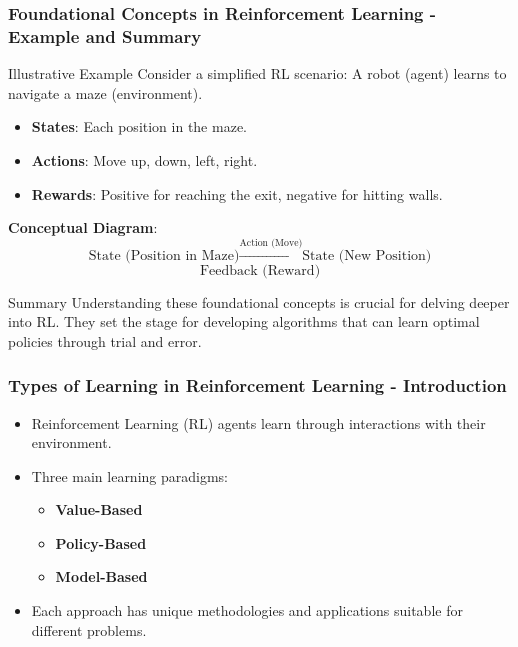 \documentclass[aspectratio=169]{beamer}
\begin{document}
\begin{frame}[fragile]
    \frametitle{Foundational Concepts in Reinforcement Learning - Example and Summary}
    \begin{block}{Illustrative Example}
        Consider a simplified RL scenario: A robot (agent) learns to navigate a maze (environment).
        \begin{itemize}
            \item \textbf{States}: Each position in the maze.
            \item \textbf{Actions}: Move up, down, left, right.
            \item \textbf{Rewards}: Positive for reaching the exit, negative for hitting walls.
        \end{itemize}
        
        \textbf{Conceptual Diagram}:
        \begin{equation*}
            \text{State (Position in Maze)} \xrightarrow{\text{Action (Move)}} \text{State (New Position)}
        \end{equation*}
        \begin{equation*}
            \text{Feedback (Reward)}
        \end{equation*}
    \end{block}

    \begin{block}{Summary}
        Understanding these foundational concepts is crucial for delving deeper into RL. They set the stage for developing algorithms that can learn optimal policies through trial and error.
    \end{block}
\end{frame}

\begin{frame}[fragile]
    \frametitle{Types of Learning in Reinforcement Learning - Introduction}
    \begin{itemize}
        \item Reinforcement Learning (RL) agents learn through interactions with their environment.
        \item Three main learning paradigms:
        \begin{itemize}
            \item \textbf{Value-Based}
            \item \textbf{Policy-Based}
            \item \textbf{Model-Based}
        \end{itemize}
        \item Each approach has unique methodologies and applications suitable for different problems.
    \end{itemize}
\end{frame}
\end{document}

